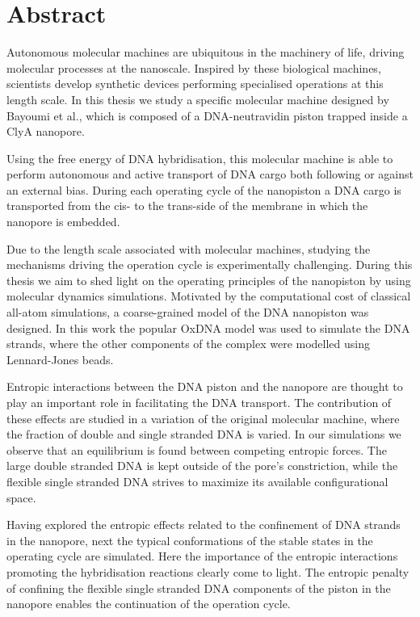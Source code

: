 \chapter*{Abstract}

Autonomous molecular machines are ubiquitous in the machinery of life, driving molecular
processes at the nanoscale. Inspired by these biological machines, scientists develop
synthetic devices performing specialised operations at this length scale. In this
thesis we study a specific molecular machine designed by Bayoumi et al.\cite{Bayoumi21},
which is composed of a DNA-neutravidin piston trapped inside a ClyA nanopore.

Using the free energy of DNA hybridisation, this molecular machine is able to perform
autonomous and active transport of DNA cargo both following or against an
external bias. During each operating cycle of the nanopiston a DNA cargo
is transported from the cis- to the trans-side of the membrane in which the nanopore is
embedded.

Due to the length scale associated with molecular machines, studying the mechanisms
driving the operation cycle is experimentally challenging. During this thesis we aim
to shed light on the operating principles of the nanopiston by using molecular dynamics
simulations. Motivated by the computational cost of classical all-atom simulations, a
coarse-grained model of the DNA nanopiston was designed. In this work the popular OxDNA
model was used to simulate the DNA strands, where the other components of the complex
were modelled using Lennard-Jones beads.

Entropic interactions between the DNA piston and the nanopore are thought to
play an important role in facilitating the DNA transport. The contribution of
these effects are studied in a variation of the original molecular machine, where the
fraction of double and single stranded DNA is varied. In our simulations we
observe that an equilibrium is found between competing entropic forces. The large double
stranded DNA is kept outside of the pore's constriction, while the flexible single
stranded DNA strives to maximize its available configurational space.

Having explored the entropic effects related to the confinement of DNA strands in the
nanopore, next the typical conformations of the stable states in the operating cycle
are simulated. Here the importance of the entropic interactions promoting the
hybridisation reactions clearly come to light. The entropic penalty of confining the
flexible single stranded DNA components of the piston in the nanopore enables the
continuation of the operation cycle.

